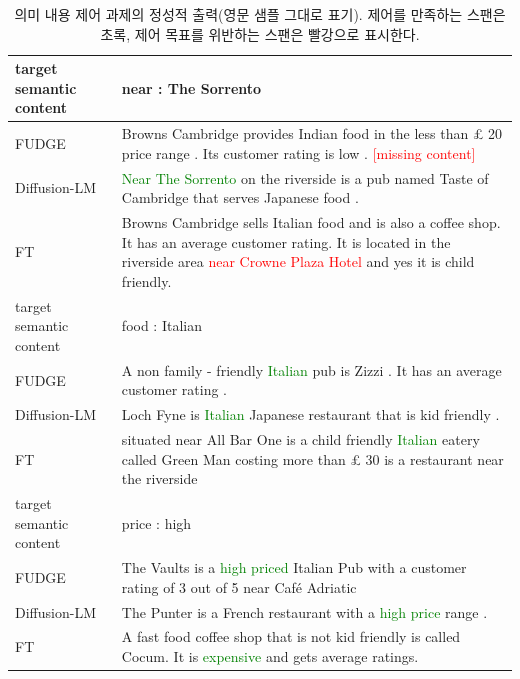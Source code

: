 \documentclass{article}
\newcommand\errorspan[1]{\textcolor{red}{#1}}
\newcommand\greenspan[1]{\textcolor{green}{#1}}
\begin{document}
\begin{table}
{\begin{tabular}{lp{13cm}}
\\
\toprule
target semantic content &  near : The Sorrento \\
\midrule
FUDGE &  Browns Cambridge provides Indian food in the less than £ 20 price range . Its customer rating is low . \errorspan{[missing content]}\\
Diffusion-LM &   \greenspan{Near The Sorrento} on the riverside is a pub named Taste of Cambridge that serves Japanese food . \\
FT &  Browns Cambridge sells Italian food and is also a coffee shop. It has an average customer rating. It is located in the riverside area \errorspan{near Crowne Plaza Hotel} and yes it is child friendly. 
\\
\toprule
target semantic content &  food : Italian \\
\midrule
FUDGE &  A non family - friendly \greenspan{Italian} pub is Zizzi . It has an average customer rating .\\
Diffusion-LM &  Loch Fyne is \greenspan{Italian} Japanese restaurant that is kid friendly . \\
FT &   situated near All Bar One is a child friendly \greenspan{Italian} eatery called Green Man costing more than £ 30 is a restaurant near the riverside 
\\
\toprule
target semantic content &  price : high \\
\midrule
FUDGE &  The Vaults is a \greenspan{high priced} Italian Pub with a customer rating of 3 out of 5 near Café Adriatic \\
Diffusion-LM &   The Punter is a French restaurant with a \greenspan{high price} range . \\
FT &  A fast food coffee shop that is not kid friendly is called Cocum. It is \greenspan{expensive} and gets average ratings. 
\\
\end{tabular}}
\caption{\label{app:qualitative-content} 의미 내용 제어 과제의 정성적 출력(영문 샘플 그대로 표기). 제어를 만족하는 스팬은 초록, 제어 목표를 위반하는 스팬은 빨강으로 표시한다.}
\end{table}
\end{document}
